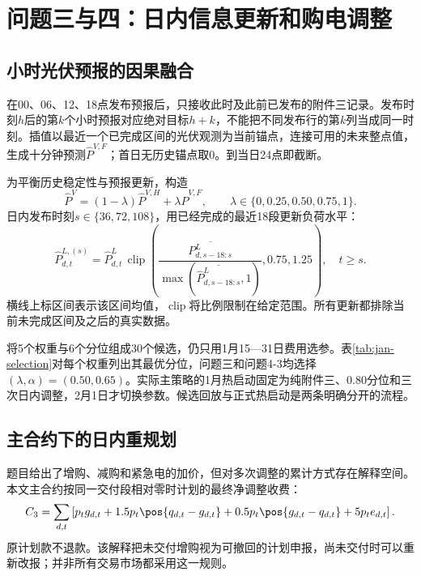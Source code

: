\section{问题三与四：日内信息更新和购电调整}
\subsection{小时光伏预报的因果融合}
在00、06、12、18点发布预报后，只接收此时及此前已发布的附件三记录。发布时刻$h$后的第$k$个小时预报对应绝对目标$h+k$，不能把不同发布行的第$k$列当成同一时刻。插值以最近一个已完成区间的光伏观测为当前锚点，连接可用的未来整点值，生成十分钟预测$\widehat P^{V,F}$；首日无历史锚点取0。到当日24点即截断。

为平衡历史稳定性与预报更新，构造
\begin{equation}
 \widehat P^V=(1-\lambda)\widehat P^{V,H}+\lambda\widehat P^{V,F},
 \qquad\lambda\in\{0,0.25,0.50,0.75,1\}.\label{eq:fusion}
\end{equation}
日内发布时刻$s\in\{36,72,108\}$，用已经完成的最近18段更新负荷水平：
\begin{equation}
 \widehat P^{L,(s)}_{d,t}=\widehat P^L_{d,t}\,
 \operatorname{clip}\!\left(
 \frac{\overline{P^L_{d,s-18:s}}}{\max(\overline{\widehat P^L_{d,s-18:s}},1)},0.75,1.25\right),\quad t\ge s.
\end{equation}
横线上标区间表示该区间均值，$\operatorname{clip}$将比例限制在给定范围。所有更新都排除当前未完成区间及之后的真实数据。

将5个权重与6个分位组成30个候选，仍只用1月15—31日费用选参。表\ref{tab:jan-selection}对每个权重列出其最优分位，问题三和问题4-3均选择$(\lambda,\alpha)=(0.50,0.65)$。实际主策略的1月热启动固定为纯附件三、0.80分位和三次日内调整，2月1日才切换参数。候选回放与正式热启动是两条明确分开的流程。


\subsection{主合约下的日内重规划}
题目给出了增购、减购和紧急电的加价，但对多次调整的累计方式存在解释空间。本文主合约按同一交付段相对零时计划的最终净调整收费：
\begin{equation}
 C_3=\sum_{d,t}\left[p_tg_{d,t}+1.5p_t\pos{q_{d,t}-g_{d,t}}
       +0.5p_t\pos{g_{d,t}-q_{d,t}}+5p_te_{d,t}\right].\label{eq:netbill}
\end{equation}
原计划款不退款。该解释把未交付增购视为可撤回的计划申报，尚未交付时可以重新改报；并非所有交易市场都采用这一规则。

